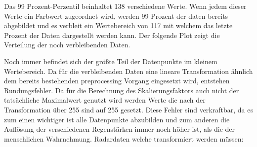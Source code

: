 %  

%  

Das 99 Prozent-Perzentil beinhaltet 138 verschiedene Werte. Wenn jedem dieser Werte ein Farbwert zugeordnet wird, werden 99 Prozent der daten bereits abgebildet und es verbleit ein Wertebereich von 117 mit welchem das letzte Prozent der Daten dargestellt werden kann.
Der folgende Plot zeigt die Verteilung der noch verbleibenden Daten.


Noch immer befindet sich der größte Teil der Datenpunkte im kleinem Wertebereich. Da für die verbleibenden Daten eine lineare Transformation ähnlich dem bereits bestehenden preprocessing Vorgang eingesetzt wird, entstehen Rundungsfehler. Da für die Berechnung des Skalierungsfaktors auch nicht der tatsächliche Maximalwert genutzt wird werden Werte die nach der Transformation über 255 sind auf 255 gesetzt. Diese Fehler sind verkraftbar, da es zum einen wichtiger ist alle Datenpunkte abzubilden und zum anderen die Auflösung der verschiedenen Regenstärken immer noch höher ist, als die der menschlichen Wahrnehmung.
Radardaten welche transformiert werden müssen:


